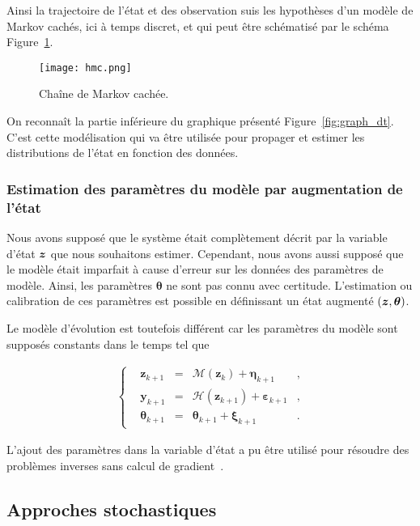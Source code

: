 Ainsi la trajectoire de l'état et des observation suis les hypothèses d'un modèle de Markov cachés, ici à temps discret, et qui peut être schématisé par le schéma Figure~\ref{fig:hidden_markov}.

\begin{figure}[h]
    \centering
    \texttt{[image: hmc.png]}
    \caption{Chaîne de Markov cachée.}
    \label{fig:hidden_markov}
\end{figure}

On reconnaît la partie inférieure du graphique présenté Figure~\ref{fig:graph_dt}. C'est cette modélisation qui va être utilisée pour propager et estimer les distributions de l'état en fonction des données.

\subsubsection{Estimation des paramètres du modèle par augmentation de l'état}
Nous avons supposé que le système était complètement décrit par la variable d'état $\bm z$ que nous souhaitons estimer. Cependant, nous avons aussi supposé que le modèle était imparfait à cause d'erreur sur les données des paramètres de modèle. Ainsi, les paramètres $\bm \theta$ ne sont pas connu avec certitude. L'estimation ou calibration de ces paramètres est possible en définissant un état augmenté $(\bm z, \bm \theta)$.

Le modèle d'évolution est toutefois différent car les paramètres du modèle sont supposés constants dans le temps tel que

\begin{gather*}
    \left\{\begin{aligned}
         & \bm{z}_{k+1}      & = & \mathcal{M}(\bm{z}_{k}) + \bm{\eta}_{k+1}          & , \\
         & \bm{y}_{k+1}      & = & \mathcal{H}(\bm{z}_{k+1}) + \bm{\varepsilon}_{k+1} & , \\
         & \bm{\theta}_{k+1} & = & \bm{\theta}_{k+1} + \bm{\xi}_{k+1}                 & .
    \end{aligned} \right.
\end{gather*}

L'ajout des paramètres dans la variable d'état a pu être utilisé pour résoudre des problèmes inverses sans calcul de gradient~\cite{iglesias_ensemble_2013}.

\subsection{Approches stochastiques}

